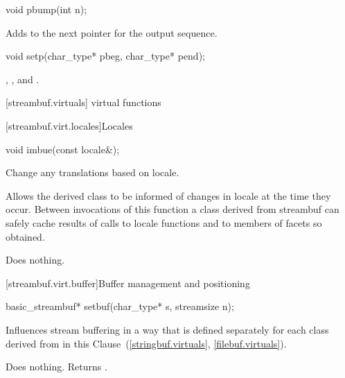 %
\begin{itemdecl}
void pbump(int n);
\end{itemdecl}

\begin{itemdescr}
\pnum
\effects
Adds  to the next pointer for the output sequence.
\end{itemdescr}

%
\begin{itemdecl}
void setp(char_type* pbeg, char_type* pend);
\end{itemdecl}

\begin{itemdescr}
\pnum
\postconditions
{},
,
and
.
\end{itemdescr}

[streambuf.virtuals]{ virtual functions}

[streambuf.virt.locales]{Locales}

%
\begin{itemdecl}
void imbue(const locale&);
\end{itemdecl}

\begin{itemdescr}
\pnum
\effects
Change any translations based on locale.

\pnum
\remarks
Allows the derived class to be informed of changes in locale at the
time they occur.
Between invocations of this function a class derived
from streambuf can safely cache results of calls to locale functions
and to members of facets so obtained.

\pnum
{}
Does nothing.
\end{itemdescr}

[streambuf.virt.buffer]{Buffer management and positioning}

%
\begin{itemdecl}
basic_streambuf* setbuf(char_type* s, streamsize n);
\end{itemdecl}

\begin{itemdescr}
\pnum
\effects
Influences stream buffering in a way that is defined separately for each class
derived from
in this Clause~(\ref{stringbuf.virtuals},
\ref{filebuf.virtuals}).

\pnum
{}
Does nothing.
Returns
.
\end{itemdescr}

